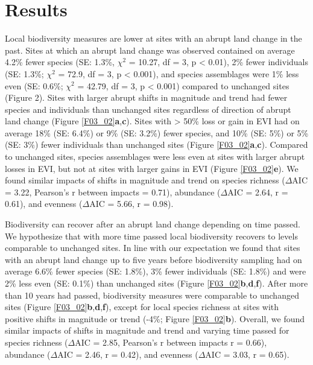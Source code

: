 \section{Results}
\label{C03_03}
Local biodiversity measures are lower at sites with an abrupt land change in the past. Sites at which an abrupt land change was observed contained on average 4.2\% fewer species (SE: 1.3\%, $\chi^2$ = 10.27, df = 3, p < 0.01), 2\% fewer individuals (SE: 1.3\%; $\chi^2$ = 72.9, df = 3, p < 0.001), and species assemblages were 1\% less even (SE: 0.6\%; $\chi^2$ = 42.79, df = 3, p < 0.001) compared to unchanged sites (Figure 2). Sites with larger abrupt shifts in magnitude and trend had fewer species and individuals than unchanged sites regardless of direction of abrupt land change (Figure \ref{F03_02}\textbf{a},\textbf{c}). Sites with > 50\% loss or gain in EVI had on average 18\% (SE: 6.4\%) or 9\% (SE: 3.2\%) fewer species, and 10\% (SE: 5\%) or 5\% (SE: 3\%) fewer individuals than unchanged sites (Figure \ref{F03_02}\textbf{a},\textbf{c}). Compared to unchanged sites, species assemblages were less even at sites with larger abrupt losses in EVI, but not at sites with larger gains in EVI (Figure \ref{F03_02}\textbf{e}). We found similar impacts of shifts in magnitude and trend on species richness ($\Delta$AIC = 3.22, Pearson’s r between impacts = 0.71), abundance ($\Delta$AIC = 2.64, r = 0.61), and evenness ($\Delta$AIC = 5.66, r = 0.98).

Biodiversity can recover after an abrupt land change depending on time passed. We hypothesize that with more time passed local biodiversity recovers to levels comparable to unchanged sites. In line with our expectation we found that sites with an abrupt land change up to five years before biodiversity sampling had on average 6.6\% fewer species (SE: 1.8\%), 3\% fewer individuals (SE: 1.8\%) and were 2\% less even (SE: 0.1\%) than unchanged sites (Figure \ref{F03_02}\textbf{b},\textbf{d},\textbf{f}). After more than 10 years had passed, biodiversity measures were comparable to unchanged sites (Figure \ref{F03_02}\textbf{b},\textbf{d},\textbf{f}), except for local species richness at sites with positive shifts in magnitude or trend (-4\%; Figure \ref{F03_02}\textbf{b}). Overall, we found similar impacts of shifts in magnitude and trend and varying time passed for species richness ($\Delta$AIC = 2.85, Pearson’s r between impacts r = 0.66), abundance ($\Delta$AIC = 2.46, r = 0.42), and evenness ($\Delta$AIC = 3.03, r = 0.65).

